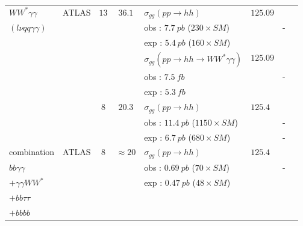 \begin{table}[h!]
\begin{center}
\begin{tabular}{|l|l|c|c|l|l|c|c|}
\hline
$WW^*\gamma\gamma$            &ATLAS            &$13$        &$36.1$        &$\sigma_{gg}(pp\rightarrow hh)$ &$125.09$     &    &\cite{Aaboud:2018ewm}\\
$(l\nu qq\gamma\gamma)$            &            &        &        &obs : $7.7\ pb$ ($230\times SM$)    &                &-    &\\
                    &            &        &        &exp : $5.4\ pb$ ($160\times SM$)    &                &    &\\
\cline{5-8}
                    &            &        &        &$\sigma_{gg}(pp\rightarrow hh\rightarrow WW^*\gamma\gamma)$  &$125.09$            &    &\\
                    &            &        &        &obs : $7.5\ fb$    &    &-    &\\
                    &            &        &        &exp : $5.3\ fb$    &    &    &\\
\cline{3-8}
                    &            &$8$        &$20.3$        &$\sigma_{gg}(pp\rightarrow hh)$  &$125.4$    &    &\cite{Aad:2015xja}\\
                    &            &        &        &obs : $11.4\ pb$ ($1150\times SM$)        &    &-    &\\
                    &            &        &        &exp : $6.7\ pb$ ($680\times SM$)        &    &-    &\\
\hline
combination                &ATLAS            &$8$        &$\approx 20$    &$\sigma_{gg}(pp\rightarrow hh)$  &$125.4$                 &    &\cite{Aad:2015xja}\\
$bb \gamma\gamma$            &            &        &        &obs : $0.69\ pb$ ($70\times SM$)            &    &-    &\\
$+\gamma\gamma WW^*$            &            &        &        &exp : $0.47\ pb$ ($48\times SM$)            &    &    &\\
$+bb \tau\tau$                &            &        &        &                            &    &    &\\
$+bb bb$                &            &        &        &                            &    &    &\\


\end{tabular}
\end{center}
\end{table}
